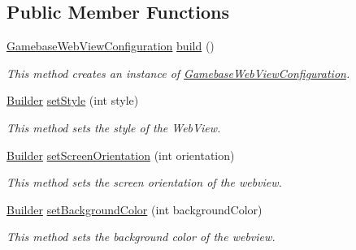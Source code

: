 \subsection*{Public Member Functions}
\begin{DoxyCompactItemize}
\item 
\hyperlink{classcom_1_1toast_1_1android_1_1gamebase_1_1_gamebase_web_view_configuration}{Gamebase\+Web\+View\+Configuration} \hyperlink{classcom_1_1toast_1_1android_1_1gamebase_1_1_gamebase_web_view_configuration_1_1_builder_aa876865decc9e4d1f0faa73926a6442a}{build} ()
\begin{DoxyCompactList}\small\item\em This method creates an instance of \hyperlink{classcom_1_1toast_1_1android_1_1gamebase_1_1_gamebase_web_view_configuration}{Gamebase\+Web\+View\+Configuration}. \end{DoxyCompactList}\item 
\hyperlink{classcom_1_1toast_1_1android_1_1gamebase_1_1_gamebase_web_view_configuration_1_1_builder}{Builder} \hyperlink{classcom_1_1toast_1_1android_1_1gamebase_1_1_gamebase_web_view_configuration_1_1_builder_abbad620c8f992e84f5c4c64b98b65798}{set\+Style} (int style)
\begin{DoxyCompactList}\small\item\em This method sets the style of the Web\+View. \end{DoxyCompactList}\item 
\hyperlink{classcom_1_1toast_1_1android_1_1gamebase_1_1_gamebase_web_view_configuration_1_1_builder}{Builder} \hyperlink{classcom_1_1toast_1_1android_1_1gamebase_1_1_gamebase_web_view_configuration_1_1_builder_a3bbc9a0a9538f529b1ab1ab4dda8669f}{set\+Screen\+Orientation} (int orientation)
\begin{DoxyCompactList}\small\item\em This method sets the screen orientation of the webview. \end{DoxyCompactList}\item 
\hyperlink{classcom_1_1toast_1_1android_1_1gamebase_1_1_gamebase_web_view_configuration_1_1_builder}{Builder} \hyperlink{classcom_1_1toast_1_1android_1_1gamebase_1_1_gamebase_web_view_configuration_1_1_builder_af7303ea6d00fac1190429bf3df99f864}{set\+Background\+Color} (int background\+Color)
\begin{DoxyCompactList}\small\item\em This method sets the background color of the webview. \end{DoxyCompactList}\item 

\end{DoxyCompactItemize}
